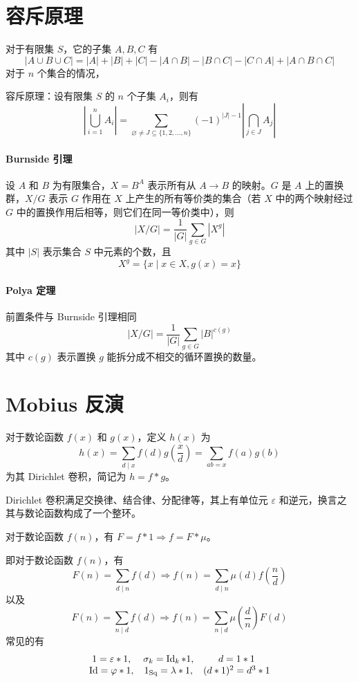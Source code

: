 \documentclass{proart}
\begin{document}
\section{容斥原理}

对于有限集 $S$，它的子集 $A,B,C$ 有
\[ |A \cup B \cup C| = |A| + |B| + |C| - |A\cap B| - |B \cap C| - |C \cap A| + |A \cap B \cap C| \]
对于 $n$ 个集合的情况，

容斥原理：设有限集 $S$ 的 $n$ 个子集 $A_i$，则有
\[ \left|\bigcup _{i=1}^{n}A_{i}\right|=\sum _{\varnothing \neq J\subseteq \{1,2,\ldots ,n\}}(-1)^{|J|-1}\left| \bigcap _{j\in J}A_{j} \right| \]

\paragraph{Burnside 引理}
设 $A$ 和 $B$ 为有限集合，$X=B^A$ 表示所有从 $A \to B$ 的映射。$G$ 是 $A$ 上的置换群，$X/G$ 表示 $G$ 作用在 $X$ 上产生的所有等价类的集合（若 $X$ 中的两个映射经过 $G$ 中的置换作用后相等，则它们在同一等价类中），则
\[ |X/G|=\frac{1}{|G|}\sum_{g\in G}|X^g| \]
其中 $|S|$ 表示集合 $S$ 中元素的个数，且
\[ X^g = \{ x \mid x \in X,g(x) = x \} \]

\paragraph{Polya 定理}
前置条件与 Burnside 引理相同
\[ |X/G|=\frac{1}{|G|}\sum_{g\in G}|B|^{c(g)} \]
其中 $c(g)$ 表示置换 $g$ 能拆分成不相交的循环置换的数量。


\section{Mobius 反演}

对于数论函数 $f(x)$ 和 $g(x)$，定义 $h(x)$ 为
\[ h(x) = \sum_{d \mid x} f(d) g\left(\frac{x}{d}\right) = \sum_{ab = x} f(a)g(b) \]
为其 Dirichlet 卷积，简记为 $h = f \ast g$。

Dirichlet 卷积满足交换律、结合律、分配律等，其上有单位元 $\varepsilon$ 和逆元，换言之其与数论函数构成了一个整环。

对于数论函数 $f(n)$，有 $F = f \ast 1 \Rightarrow f = F \ast \mu$。

即对于数论函数 $f(n)$，有
\[ F(n) = \sum_{d \mid n} f(d) \Rightarrow f(n) = \sum_{d \mid n} \mu(d)f\left(\frac{n}{d}\right) \]
以及
\[ F(n) = \sum_{n \mid d} f(d) \Rightarrow f(n) = \sum_{n \mid d} \mu\left(\frac{d}{n}\right)F(d) \]
常见的有
\[ \begin{matrix}
    1 = \varepsilon \ast 1, & \sigma_k = \operatorname{Id}_k \ast 1,& d = 1 \ast 1 \\
    \operatorname{Id} = \varphi \ast 1, & 1_{\operatorname{Sq}} = \lambda \ast 1, &(d \ast 1)^2 = d^3 \ast 1
\end{matrix} \]
\end{document}

